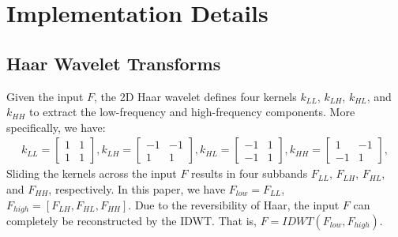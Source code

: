 \documentclass{article}
\begin{document}
\clearpage
\printbibliography





\clearpage
\appendix

\section{Implementation Details}
\subsection{Haar Wavelet Transforms}
Given the input $F$, the 2D Haar wavelet defines four kernels $k_{LL}$, $k_{LH}$, $k_{HL}$, and $k_{HH}$ to extract the low-frequency and high-frequency components.
More specifically, we have:
\begin{gather}
   k_{LL} = \begin{bmatrix} 1 & 1 \\ 1 & 1 \end{bmatrix}, k_{LH} = \begin{bmatrix} -1& -1 \\ 1 & 1 \end{bmatrix},
   k_{HL} = \begin{bmatrix} -1& 1 \\ -1 & 1 \end{bmatrix},
   k_{HH} = \begin{bmatrix} 1& -1 \\ -1 & 1 \end{bmatrix},
\end{gather}
Sliding the kernels across the input $F$ results in four subbands $F_{LL}$, $F_{LH}$, $F_{HL}$, and $F_{HH}$, respectively. In this paper, we have $F_{low} = F_{LL}$, $F_{high} = [F_{LH}, F_{HL}, F_{HH}]$. Due to the reversibility of Haar, the input $F$ can completely be reconstructed by the IDWT. That is, $F = IDWT(F_{low}, F_{high})$.
\end{document}
